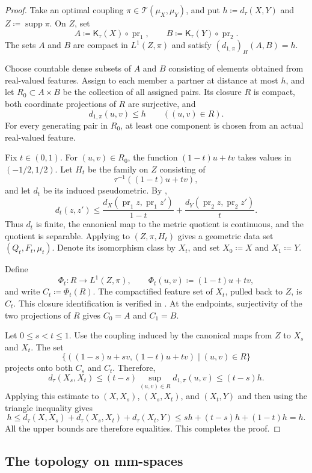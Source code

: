 \documentclass[11pt]{amsart}
\theoremstyle{plain}
\theoremstyle{definition}
\theoremstyle{remark}
\newcommand{\T}{\mathcal T}
\newcommand{\Kc}{\mathsf K}
\newcommand{\dtau}{d_{\tau}}
\DeclareMathOperator{\pr}{pr}
\DeclareMathOperator{\supp}{supp}
\begin{document}
\begin{proof}
Take an optimal coupling $\pi\in\T(\mu_X,\mu_Y)$, and put $h\coloneqq\dtau(X,Y)$ and $Z\coloneqq\supp\pi$. On $Z$, set
\[
A\coloneqq\Kc_\tau(X)\circ\pr_1,\qquad
B\coloneqq\Kc_\tau(Y)\circ\pr_2.
\]
The sets $A$ and $B$ are compact in $L^1(Z,\pi)$ and satisfy $(d_{1,\pi})_H(A,B)=h$.

Choose countable dense subsets of $A$ and $B$ consisting of elements obtained from real-valued features. Assign to each member a partner at distance at most $h$, and let $R_0\subset A\times B$ be the collection of all assigned pairs. Its closure $R$ is compact, both coordinate projections of $R$ are surjective, and
\[
d_{1,\pi}(u,v)\leq h\qquad((u,v)\in R).
\]
For every generating pair in $R_0$, at least one component is chosen from an actual real-valued feature.

Fix $t\in(0,1)$. For $(u,v)\in R_0$, the function $(1-t)u+tv$ takes values in $(-1/2,1/2)$. Let $H_t$ be the family on $Z$ consisting of
\[
\tau^{-1}((1-t)u+tv),
\]
and let $d_t$ be its induced pseudometric. By ,
\[
d_t(z,z')\leq
\frac{d_X(\pr_1z,\pr_1z')}{1-t}
+\frac{d_Y(\pr_2z,\pr_2z')}{t}.
\]
Thus $d_t$ is finite, the canonical map to the metric quotient is continuous, and the quotient is separable. Applying  to $(Z,\pi,H_t)$ gives a geometric data set $(Q_t,F_t,\mu_t)$. Denote its isomorphism class by $X_t$, and set $X_0\coloneqq X$ and $X_1\coloneqq Y$.

Define
\[
\Phi_t\colon R\longrightarrow L^1(Z,\pi),\qquad
\Phi_t(u,v)\coloneqq(1-t)u+tv,
\]
and write $C_t\coloneqq\Phi_t(R)$. The compactified feature set of $X_t$, pulled back to $Z$, is $C_t$. This closure identification is verified in . At the endpoints, surjectivity of the two projections of $R$ gives $C_0=A$ and $C_1=B$.

Let $0\leq s<t\leq1$. Use the coupling induced by the canonical maps from $Z$ to $X_s$ and $X_t$. The set
\[
\{((1-s)u+sv,(1-t)u+tv)\mid(u,v)\in R\}
\]
projects onto both $C_s$ and $C_t$. Therefore,
\[
\dtau(X_s,X_t)
\leq(t-s)\sup_{(u,v)\in R}d_{1,\pi}(u,v)
\leq(t-s)h.
\]
Applying this estimate to $(X,X_s)$, $(X_s,X_t)$, and $(X_t,Y)$ and then using the triangle inequality gives
\[
h\leq\dtau(X,X_s)+\dtau(X_s,X_t)+\dtau(X_t,Y)
\leq sh+(t-s)h+(1-t)h=h.
\]
All the upper bounds are therefore equalities. This completes the proof.
\end{proof}

\subsection{The topology on mm-spaces}
\label{subsec:mm-topology}
\end{document}
